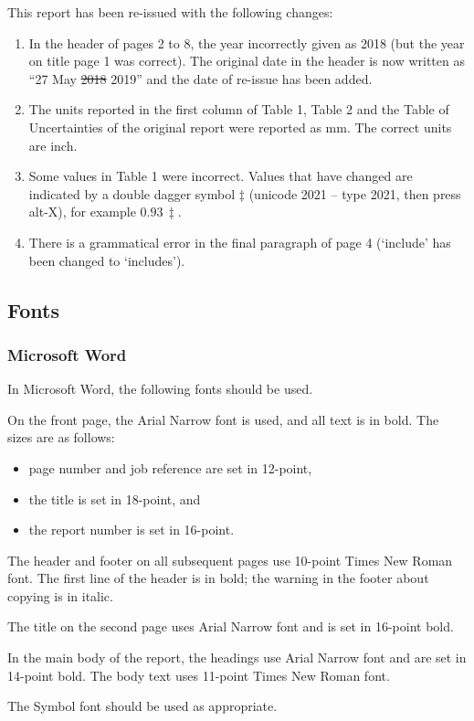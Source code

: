 This report has been re-issued with the following changes:
\begin{enumerate}
\item	In the header of pages 2 to 8, the year incorrectly given as 2018 (but the year on title page 1 was correct).  The original date in the header is now written as ``27 May \sout{2018} 2019'' and the date of re-issue has been added.  
\item	The units reported in the first column of Table 1, Table 2 and the Table of Uncertainties of the original report were reported as mm. The correct units are inch. 
\item	Some values in Table 1 were incorrect. Values that have changed are indicated by a double dagger symbol $\ddagger$ (unicode 2021 – type 2021, then press alt-X), for example $0.93\,\ddagger$.
\item	There is a grammatical error in the final paragraph of page 4 (`include' has been changed to `includes').
\end{enumerate}  

\subsection{Fonts}
\subsubsection{Microsoft Word}
In Microsoft Word, the following fonts should be used.

On the front page, the Arial Narrow font is used, and all text is in bold. The sizes are as follows:
\begin{itemize}
\item	page number and job reference are set in 12-point, 
\item	the title is set in 18-point, and 
\item	the report number is set in 16-point.
\end{itemize}
The header and footer on all subsequent pages use 10-point Times New Roman font. The first line of the header is in bold; the warning in the footer about copying is in italic. 

The title on the second page uses Arial Narrow font and is set in 16-point bold.

In the main body of the report, the headings use Arial Narrow font and are set in 14-point bold. The body text uses 11-point Times New Roman font.
 
The Symbol font should be used as appropriate.

